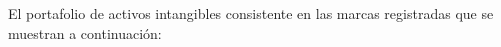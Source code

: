 \item El portafolio de activos intangibles consistente en las marcas registradas que se muestran a continuaci\'on:
